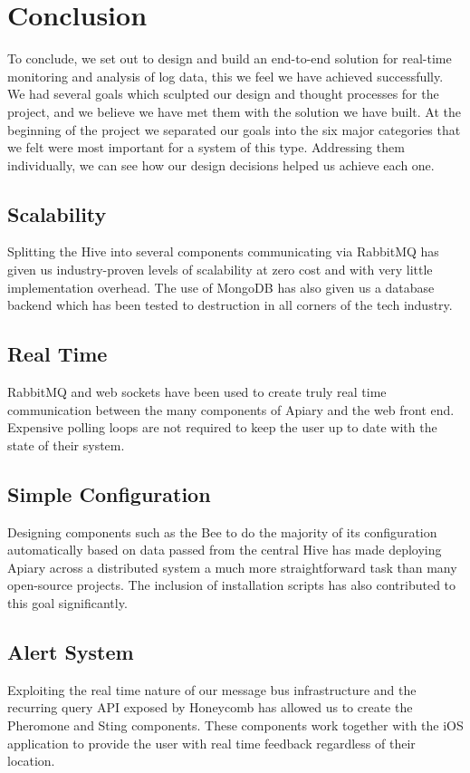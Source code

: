 \section{Conclusion}

To conclude, we set out to design and build an end-to-end solution for real-time
monitoring and analysis of log data, this we feel we have achieved successfully.
We had several goals which sculpted our design and thought processes for the
project, and we believe we have met them with the solution we have built. At the
beginning of the project we separated our goals into the six major categories
that we felt were most important for a system of this type. Addressing them
individually, we can see how our design decisions helped us achieve each one.

\subsection{Scalability}

Splitting the Hive into several components communicating via RabbitMQ has given
us industry-proven levels of scalability at zero cost and with very little
implementation overhead. The use of MongoDB has also given us a database backend
which has been tested to destruction in all corners of the tech
industry\cite{nosql}.


\subsection{Real Time} RabbitMQ and web sockets have been used to create truly
real time communication between the many components of Apiary and the web front
end. Expensive polling loops are not required to keep the user up to date with
the state of their system.


\subsection{Simple Configuration} Designing components such as the Bee to do the
majority of its configuration automatically based on data passed from the
central Hive has made deploying Apiary across a distributed system a much more
straightforward task than many open-source projects. The inclusion of
installation scripts has also contributed to this goal significantly.


\subsection{Alert System} Exploiting the real time nature of our message bus
infrastructure and the recurring query API exposed by Honeycomb has allowed us
to create the Pheromone and Sting components. These components work together
with the iOS application to provide the user with real time feedback regardless
of their location.


